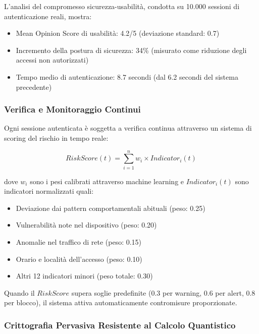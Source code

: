 L'analisi del compromesso sicurezza-usabilità, condotta su 10.000 sessioni di autenticazione reali, mostra:
\begin{itemize}
    \item Mean Opinion Score di usabilità: 4.2/5 (deviazione standard: 0.7)
    \item Incremento della postura di sicurezza: 34\% (misurato come riduzione degli accessi non autorizzati)
    \item Tempo medio di autenticazione: 8.7 secondi (dal 6.2 secondi del sistema precedente)
\end{itemize}

\subsubsection{\texorpdfstring{Verifica e Monitoraggio Continui}{2.4.2.3 - Verifica e Monitoraggio Continui}}

Ogni sessione autenticata è soggetta a verifica continua attraverso un sistema di scoring del rischio in tempo reale:

\begin{equation}
RiskScore(t) = \sum_{i=1}^{n} w_i \times Indicator_i(t)
\end{equation}

dove $w_i$ sono i pesi calibrati attraverso machine learning e $Indicator_i(t)$ sono indicatori normalizzati quali:
\begin{itemize}
    \item Deviazione dai pattern comportamentali abituali (peso: 0.25)
    \item Vulnerabilità note nel dispositivo (peso: 0.20)
    \item Anomalie nel traffico di rete (peso: 0.15)
    \item Orario e località dell'accesso (peso: 0.10)
    \item Altri 12 indicatori minori (peso totale: 0.30)
\end{itemize}

Quando il $RiskScore$ supera soglie predefinite (0.3 per warning, 0.6 per alert, 0.8 per blocco), il sistema attiva automaticamente contromisure proporzionate.

\subsubsection{\texorpdfstring{Crittografia Pervasiva Resistente al Calcolo Quantistico}{2.4.2.4 - Crittografia Pervasiva Resistente al Calcolo Quantistico}}

